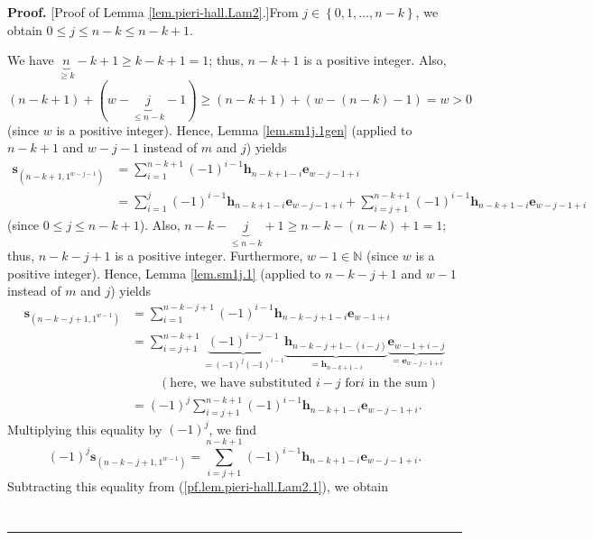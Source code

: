 \documentclass[numbers=enddot,12pt,final,onecolumn,notitlepage]{scrartcl}%
\theoremstyle{definition}
\newenvironment{proof}[1][Proof]{\noindent\textbf{#1.} }{\ \rule{0.5em}{0.5em}}
\let\sumnonlimits\sum
\renewcommand{\sum}{\sumnonlimits\limits}
\begin{document}
\begin{proof}
[Proof of Lemma \ref{lem.pieri-hall.Lam2}.]From $j\in\left\{  0,1,\ldots
,n-k\right\}  $, we obtain $0\leq j\leq n-k\leq n-k+1$.

We have $\underbrace{n}_{\geq k}-k+1\geq k-k+1=1$; thus, $n-k+1$ is a positive
integer. Also, $\left(  n-k+1\right)  +\left(  w-\underbrace{j}_{\leq
n-k}-1\right)  \geq\left(  n-k+1\right)  +\left(  w-\left(  n-k\right)
-1\right)  =w>0$ (since $w$ is a positive integer). Hence, Lemma
\ref{lem.sm1j.1gen} (applied to $n-k+1$ and $w-j-1$ instead of $m$ and $j$)
yields%
\begin{align}
\mathbf{s}_{\left(  n-k+1,1^{w-j-1}\right)  }  &  =\sum_{i=1}^{n-k+1}\left(
-1\right)  ^{i-1}\mathbf{h}_{n-k+1-i}\mathbf{e}_{w-j-1+i}\nonumber\\
&  =\sum_{i=1}^{j}\left(  -1\right)  ^{i-1}\mathbf{h}_{n-k+1-i}\mathbf{e}%
_{w-j-1+i}+\sum_{i=j+1}^{n-k+1}\left(  -1\right)  ^{i-1}\mathbf{h}%
_{n-k+1-i}\mathbf{e}_{w-j-1+i} \label{pf.lem.pieri-hall.Lam2.1}%
\end{align}
(since $0\leq j\leq n-k+1$). Also, $n-k-\underbrace{j}_{\leq n-k}+1\geq
n-k-\left(  n-k\right)  +1=1$; thus, $n-k-j+1$ is a positive integer.
Furthermore, $w-1\in\mathbb{N}$ (since $w$ is a positive integer). Hence,
Lemma \ref{lem.sm1j.1} (applied to $n-k-j+1$ and $w-1$ instead of $m$ and $j$)
yields%
\begin{align*}
\mathbf{s}_{\left(  n-k-j+1,1^{w-1}\right)  }  &  =\sum_{i=1}^{n-k-j+1}\left(
-1\right)  ^{i-1}\mathbf{h}_{n-k-j+1-i}\mathbf{e}_{w-1+i}\\
&  =\sum_{i=j+1}^{n-k+1}\underbrace{\left(  -1\right)  ^{i-j-1}}_{=\left(
-1\right)  ^{j}\left(  -1\right)  ^{i-1}}\underbrace{\mathbf{h}%
_{n-k-j+1-\left(  i-j\right)  }}_{=\mathbf{h}_{n-k+1-i}}\underbrace{\mathbf{e}%
_{w-1+i-j}}_{=\mathbf{e}_{w-j-1+i}}\\
&  \ \ \ \ \ \ \ \ \ \ \left(  \text{here, we have substituted }i-j\text{ for
}i\text{ in the sum}\right) \\
&  =\left(  -1\right)  ^{j}\sum_{i=j+1}^{n-k+1}\left(  -1\right)
^{i-1}\mathbf{h}_{n-k+1-i}\mathbf{e}_{w-j-1+i}.
\end{align*}
Multiplying this equality by $\left(  -1\right)  ^{j}$, we find%
\[
\left(  -1\right)  ^{j}\mathbf{s}_{\left(  n-k-j+1,1^{w-1}\right)  }%
=\sum_{i=j+1}^{n-k+1}\left(  -1\right)  ^{i-1}\mathbf{h}_{n-k+1-i}%
\mathbf{e}_{w-j-1+i}.
\]
Subtracting this equality from (\ref{pf.lem.pieri-hall.Lam2.1}), we obtain%
\begin{align}

\end{align}
\end{proof}
\end{document}
